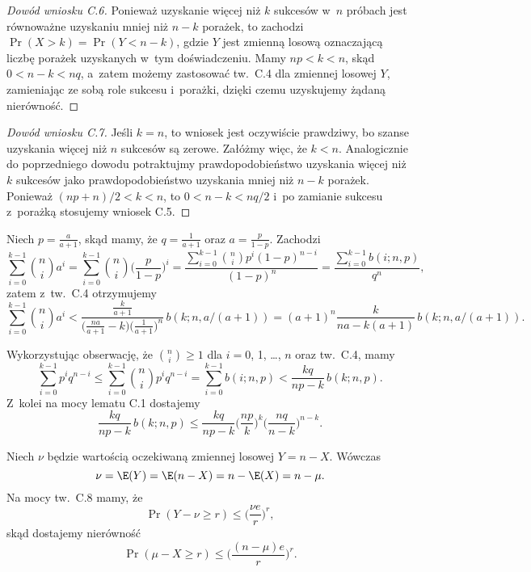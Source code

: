 \exercise %
\begin{proof}[Dowód wniosku C.6]
	Ponieważ uzyskanie więcej niż $k$ sukcesów w~$n$ próbach jest równoważne uzyskaniu mniej niż $n-k$ porażek, to zachodzi $\Pr(X>k)=\Pr(Y<n-k)$, gdzie $Y$ jest zmienną losową oznaczającą liczbę porażek uzyskanych w~tym doświadczeniu.
Mamy $np<k<n$, skąd $0<n-k<nq$, a~zatem możemy zastosować tw.\ C.4 dla zmiennej losowej $Y$, zamieniając ze sobą role sukcesu i~porażki, dzięki czemu uzyskujemy żądaną nierówność.
\end{proof}

\begin{proof}[Dowód wniosku C.7]
	Jeśli $k=n$, to wniosek jest oczywiście prawdziwy, bo szanse uzyskania więcej niż $n$ sukcesów są zerowe.
Załóżmy więc, że $k<n$.
Analogicznie do poprzedniego dowodu potraktujmy prawdopodobieństwo uzyskania więcej niż $k$ sukcesów jako prawdopodobieństwo uzyskania mniej niż $n-k$ porażek.
Ponieważ $(np+n)/2<k<n$, to $0<n-k<nq/2$ i~po zamianie sukcesu z~porażką stosujemy wniosek C.5.
\end{proof}

\exercise %

\noindent Niech $p=\frac{a}{a+1}$, skąd mamy, że $q=\frac{1}{a+1}$ oraz $a=\frac{p}{1-p}$.
Zachodzi
\[
	\sum_{i=0}^{k-1}\binom{n}{i}a^i = \sum_{i=0}^{k-1}\binom{n}{i}\biggl(\frac{p}{1-p}\biggr)^i = \frac{\sum_{i=0}^{k-1}\binom{n}{i}p^i(1-p)^{n-i}}{(1-p)^n} = \frac{\sum_{i=0}^{k-1}b(i;n,p)}{q^n},
\]
zatem z~tw.\ C.4 otrzymujemy
\[
	\sum_{i=0}^{k-1}\binom{n}{i}a^i < \frac{\frac{k}{a+1}}{\bigl(\frac{na}{a+1}-k\bigr)\bigl(\frac{1}{a+1}\bigr)^n}\,b(k;n,a/(a+1)) = (a+1)^n\frac{k}{na-k(a+1)}\,b(k;n,a/(a+1)).
\]

\exercise %
Wykorzystując obserwację, że $\binom{n}{i}\ge1$ dla $i=0$, 1, \dots, $n$ oraz tw.\ C.4, mamy
\[
	\sum_{i=0}^{k-1}p^iq^{n-i} \le \sum_{i=0}^{k-1}\binom{n}{i}p^iq^{n-i} = \sum_{i=0}^{k-1}b(i;n,p) < \frac{kq}{np-k}\,b(k;n,p).
\]
Z~kolei na mocy lematu C.1 dostajemy
\[
	\frac{kq}{np-k}\,b(k;n,p) \le \frac{kq}{np-k}\biggl(\frac{np}{k}\biggr)^k\biggl(\frac{nq}{n-k}\biggr)^{n-k}.
\]

\exercise %

\noindent Niech $\nu$ będzie wartością oczekiwaną zmiennej losowej $Y=n-X$.
Wówczas
\[
        \nu = \E(Y) = \E(n-X) = n-\E(X) = n-\mu.
\]
Na mocy tw.\ C.8 mamy, że
\[
        \Pr(Y-\nu\ge r) \le \biggl(\frac{\nu e}{r}\biggr)^r,
\]
skąd dostajemy nierówność
\[
        \Pr(\mu-X\ge r) \le \biggl(\frac{(n-\mu)e}{r}\biggr)^r.
\]

